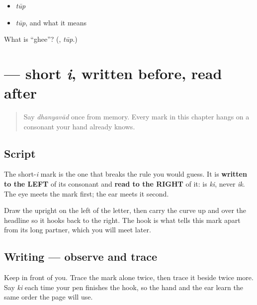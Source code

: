 \begin{itemize}
\raggedright
  \item \emph{tūp}
  \item \emph{tūp}, and what it means
\end{itemize}

\begin{tcolorbox}[breakable,colback=teal!4,colframe=teal!35!black,title={Before you move on}]
What is \textquotedblleft{}ghee\textquotedblright{}? (\textbf{}, \emph{tūp}.)
\end{tcolorbox}
\section[\texorpdfstring{\mr{ि} (i)}{ि (i)}]{ — short \emph{i}, written before, read after}

\label{lesson:MR-W05-i-matra}



\begin{quote}
Say \emph{dhanyavād} once from memory. Every mark in this chapter hangs on a consonant your hand already knows.
\end{quote}

\subsection*{Script}
\begin{quote}
\end{quote}

The short-\emph{i} mark is the one that breaks the rule you would guess. It is \textbf{written to the LEFT} of its consonant and \textbf{read to the RIGHT} of it: \textbf{} is \emph{ki}, never \emph{ik}. The eye meets the mark first; the ear meets it second.

Draw the upright on the left of the letter, then carry the curve up and over the headline so it hooks back to the right. The hook is what tells this mark apart from its long partner, which you will meet later.

\subsection*{Writing — observe and trace}
Keep \textbf{} in front of you. Trace the mark alone twice, then trace it beside \textbf{} twice more. Say \emph{ki} each time your pen finishes the hook, so the hand and the ear learn the same order the page will use.

